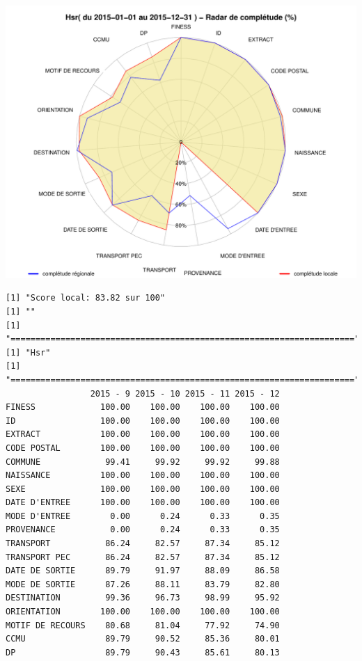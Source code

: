 \documentclass[]{article}
\begin{document}
\includegraphics{completude_files/figure-latex/finess-18.pdf}

\begin{verbatim}
[1] "Score local: 83.82 sur 100"
[1] ""
[1] "====================================================================="
[1] "Hsr"
[1] "====================================================================="
                 2015 - 9 2015 - 10 2015 - 11 2015 - 12
FINESS             100.00    100.00    100.00    100.00
ID                 100.00    100.00    100.00    100.00
EXTRACT            100.00    100.00    100.00    100.00
CODE POSTAL        100.00    100.00    100.00    100.00
COMMUNE             99.41     99.92     99.92     99.88
NAISSANCE          100.00    100.00    100.00    100.00
SEXE               100.00    100.00    100.00    100.00
DATE D'ENTREE      100.00    100.00    100.00    100.00
MODE D'ENTREE        0.00      0.24      0.33      0.35
PROVENANCE           0.00      0.24      0.33      0.35
TRANSPORT           86.24     82.57     87.34     85.12
TRANSPORT PEC       86.24     82.57     87.34     85.12
DATE DE SORTIE      89.79     91.97     88.09     86.58
MODE DE SORTIE      87.26     88.11     83.79     82.80
DESTINATION         99.36     96.73     98.99     95.92
ORIENTATION        100.00    100.00    100.00    100.00
MOTIF DE RECOURS    80.68     81.04     77.92     74.90
CCMU                89.79     90.52     85.36     80.01
DP                  89.79     90.43     85.61     80.13
\end{verbatim}
\end{document}
